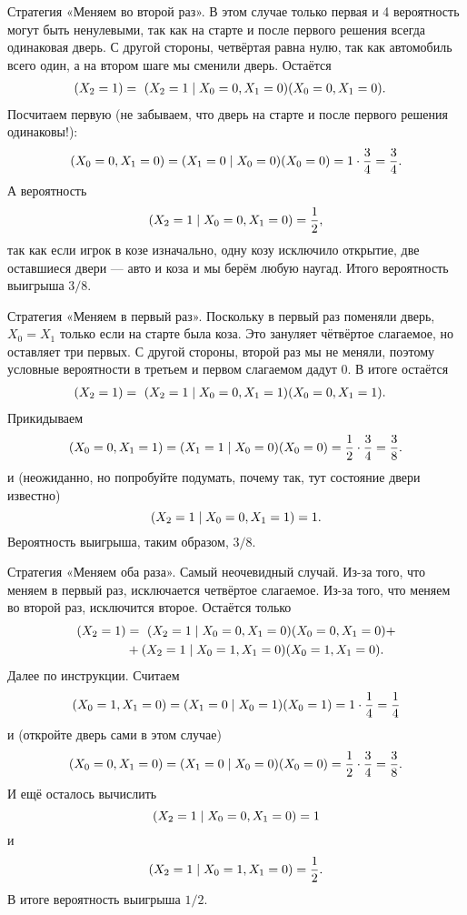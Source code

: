 \documentclass[12pt]{article}
\let\P\relax
\DeclareMathOperator{\P}{\mathbb{P}}
\begin{document}
\begin{enumerate}
    Стратегия «Меняем во второй раз». 
    В этом случае только первая и 4 вероятность могут быть ненулевыми, 
    так как на старте и после первого решения всегда одинаковая дверь. 
    С другой стороны, четвёртая равна нулю, так как автомобиль всего один, а на втором шаге мы сменили дверь. 
    Остаётся
    \begin{align*}
    \P(X_2=1) &= ~ \P(X_2=1 \mid X_0=0, X_1=0) \P(X_0=0,X_1=0).
    \end{align*}
    Посчитаем первую (не забываем, что дверь на старте и после первого решения одинаковы!):
    \[
    \P(X_0=0,X_1=0) = \P(X_1=0 \mid X_0 = 0) \P(X_0=0) = 1 \cdot \frac{3}{4} = \frac{3}{4}.
    \]
    А вероятность
    \[
    \P(X_2=1 \mid X_0=0, X_1=0) = \frac{1}{2},
    \]
    так как если игрок в козе изначально, одну козу исключило открытие, 
    две оставшиеся двери — авто и коза и мы берём любую наугад. 
    Итого вероятность выигрыша $3/8$.
    
    Стратегия «Меняем в первый раз». 
    Поскольку в первый раз поменяли дверь, $X_0=X_1$ только если на старте была коза. 
    Это зануляет чётвёртое слагаемое, но оставляет три первых. 
    С другой стороны, второй раз мы не меняли, поэтому условные вероятности в третьем и первом слагаемом дадут $0$. В итоге остаётся
    \begin{align*}
    \P(X_2=1) &= ~ \P(X_2=1 \mid X_0=0, X_1=1) \P(X_0=0,X_1=1).
    \end{align*}
    Прикидываем
    \[
    \P(X_0=0,X_1=1) = \P(X_1=1 \mid X_0=0) \P(X_0=0) = \frac{1}{2} \cdot \frac{3}{4} = \frac{3}{8}.
    \]
    и (неожиданно, но попробуйте подумать, почему так, тут состояние двери известно)
    \[
    \P(X_2=1 \mid X_0=0, X_1=1) = 1.
    \]
    Вероятность выигрыша, таким образом, $3/8$.
    
    Стратегия «Меняем оба раза». 
    Самый неочевидный случай. 
    Из-за того, что меняем в первый раз, исключается четвёртое слагаемое. 
    Из-за того, что меняем во второй раз, исключится второе. 
    Остаётся только
    \begin{align*}
    \P(X_2=1) &= ~ \P(X_2=1 \mid X_0=0,X_1=0) \P(X_0=0,X_1=0) +\\
    &+ \P(X_2=1 \mid X_0=1, X_1=0) \P(X_0=1,X_1=0).
    \end{align*}
    Далее по инструкции. Считаем
    \[
    \P(X_0=1,X_1=0) = \P(X_1=0 \mid X_0=1) \P(X_0=1) = 1 \cdot \frac{1}{4} = \frac{1}{4}
    \]
    и (откройте дверь сами в этом случае)
    \[
    \P(X_0=0,X_1=0) = \P(X_1=0 \mid X_0=0) \P(X_0=0) = \frac{1}{2} \cdot \frac{3}{4} = \frac{3}{8}.
    \]
    И ещё осталось вычислить 
    \[
    \P(X_2=1 \mid X_0=0, X_1=0) = 1 
    \]
    и
    \[
    \P(X_2=1 \mid X_0=1, X_1=0) = \frac{1}{2}.
    \]
    В итоге вероятность выигрыша $1/2$.
    

\end{enumerate}
\end{document}
